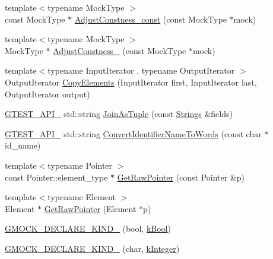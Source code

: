\begin{DoxyCompactItemize}
\item 
{\footnotesize template$<$typename Mock\+Type $>$ }\\const Mock\+Type $\ast$ \mbox{\hyperlink{namespacetesting_1_1internal_a018d17632278ac8fc2c9dcaaf629b62d}{Adjust\+Constness\+\_\+const}} (const Mock\+Type $\ast$mock)
\item 
{\footnotesize template$<$typename Mock\+Type $>$ }\\Mock\+Type $\ast$ \mbox{\hyperlink{namespacetesting_1_1internal_afbaa05a53fd7fa8be3ae1320dcd01754}{Adjust\+Constness\+\_\+}} (const Mock\+Type $\ast$mock)
\item 
{\footnotesize template$<$typename Input\+Iterator , typename Output\+Iterator $>$ }\\Output\+Iterator \mbox{\hyperlink{namespacetesting_1_1internal_a9372c12747bcf964aacb1284f8048cae}{Copy\+Elements}} (Input\+Iterator first, Input\+Iterator last, Output\+Iterator output)
\item 
\mbox{\hyperlink{gtest-port_8h_aa73be6f0ba4a7456180a94904ce17790}{G\+T\+E\+S\+T\+\_\+\+A\+P\+I\+\_\+}} std\+::string \mbox{\hyperlink{namespacetesting_1_1internal_a4ffe5309bf49f08145ed010a6d244e41}{Join\+As\+Tuple}} (const \mbox{\hyperlink{namespacetesting_1_1internal_a50003bb76ec2934be1062be11efba8bf}{Strings}} \&fields)
\item 
\mbox{\hyperlink{gtest-port_8h_aa73be6f0ba4a7456180a94904ce17790}{G\+T\+E\+S\+T\+\_\+\+A\+P\+I\+\_\+}} std\+::string \mbox{\hyperlink{namespacetesting_1_1internal_a0b375abcf3081393e6c420194a541b29}{Convert\+Identifier\+Name\+To\+Words}} (const char $\ast$id\+\_\+name)
\item 
{\footnotesize template$<$typename Pointer $>$ }\\const Pointer\+::element\+\_\+type $\ast$ \mbox{\hyperlink{namespacetesting_1_1internal_ae88d1a6f95165c43c27a6c0e2d357e61}{Get\+Raw\+Pointer}} (const Pointer \&p)
\item 
{\footnotesize template$<$typename Element $>$ }\\Element $\ast$ \mbox{\hyperlink{namespacetesting_1_1internal_a4d17b114b61b805ac5f37e9c26e29e55}{Get\+Raw\+Pointer}} (Element $\ast$p)
\item 
\mbox{\hyperlink{namespacetesting_1_1internal_a20f5584732e44a368e7acf295b639319}{G\+M\+O\+C\+K\+\_\+\+D\+E\+C\+L\+A\+R\+E\+\_\+\+K\+I\+N\+D\+\_\+}} (bool, \mbox{\hyperlink{namespacetesting_1_1internal_aa8747bda20137c9aa7f846dee830e686a3af2191917fb1796599139b3615302fe}{k\+Bool}})
\item 
\mbox{\hyperlink{namespacetesting_1_1internal_ac8f3722ca21d8b14f86e5c949e843508}{G\+M\+O\+C\+K\+\_\+\+D\+E\+C\+L\+A\+R\+E\+\_\+\+K\+I\+N\+D\+\_\+}} (char, \mbox{\hyperlink{namespacetesting_1_1internal_aa8747bda20137c9aa7f846dee830e686a8a52f0fd73e05da35c45d80653633cab}{k\+Integer}})

\end{DoxyCompactItemize}
